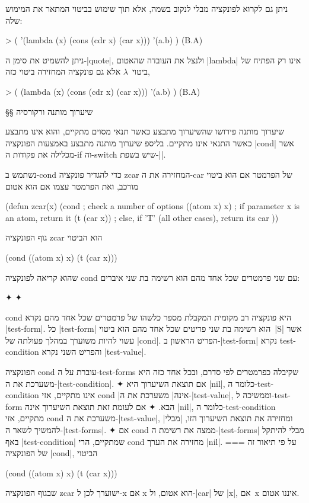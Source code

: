ניתן גם לקרוא לפונקציה מבלי לנקוב בשמה, אלא תוך שימוש בביטוי המתאר את המימוש
שלה:
\pagebreak[3]
\begin{LISP}
> (
    '(lambda (x)
      (cons (cdr x) (car x)))
    '(a.b)
)
(B.A)
\end{LISP}
ניתן להשמיט את סימן ה-\E|quote|, ולנצל את העובדה שהאטום \T|lambda| אינו רק
הפתיח של ביטוי~$λ$ אלא גם פונקציה המחזירה ביטוי כזה,
\begin{LISP}
> (
    (lambda (x) (cons (cdr x) (car x)))
    '(a.b)
)
(B.A)
\end{LISP}

§§ שיערוך מותנה ורקורסיה

שיערוך מותנה פירושו שהשיערוך מתבצע כאשר תנאי מסוים מתקיים, והוא אינו מתבצע
כאשר התנאי אינו מתקיים. בליספ שיערוך מותנה מתבצע באמצעות הפונקציה \E|cond|
אשר מכלילה את פקודות ה-if וה-switch שיש בשפת-\E|\CPL|.

נשתמש ב-cond כדי להגדיר פונקציה zcar המחזירה את ה-car של הפרמטר אם
הוא ביטוי מורכב, ואת הפרמטר עצמו אם הוא אטום
\begin{LISP}
(defun zcar(x)
  (cond ; check a number of options
    ((atom x) x) ; if parameter x is an atom, return it
    (t (car x)) ; else, if 'T' (all other cases), return its car
))
\end{LISP}
גוף הפונקציה zcar הוא הביטוי
\begin{LISP}
  (cond ((atom x) x) (t (car x)))
\end{LISP}
שהוא קריאה לפונקציה cond עם שני פרמטרים שכל אחד מהם הוא רשימה בת שני איברים:
\begin{LTR}
  \begin{itemize}
    ✦ 
    ✦ 
  \end{itemize}
\end{LTR}
cond היא פונקציה רב מקומית המקבלת מספר כלשהו של פרמטרים שכל אחד מהם נקרא
\E|test-form|. כל \E|test-form| הוא רשימה בת שני פריטים שכל אחד מהם הוא ביטוי~\E|S|
אשר עשוי להיות משוערך במהלך פעולתה של \E|cond|. הפריט הראשון ב-\E|test-form|
נקרא test-condition והפריט השני נקרא \E|test-value|.

הפונקציה cond עוברת על ה-test-forms שקיבלה כפרמטרים לפי סדרם, ובכל אחד כזה היא
משערכת את ה-\E|test-condition|.
✦ אם תוצאת השיערוך היא \E|nil|, כלומר ה-test-condition אינו מתקיים, אזי cond
\ע|אינה| משערכת את ה-\E|test-value|, וממשיכה ל-test-form הבא.
✦ אם לעומת זאת תוצאת השיערוך אינה \E|nil|, כלומר ה-test-condition מתקיים, אזי
cond משערכת את ה-\E|test-value|, ומחזירה את תוצאת השיערוך הזו, \ע|מבלי|
להמשיך לשאר ה-\E|test-forms|.
✦ אם cond ממצה את רשימת ה-\E|test-forms| מבלי להיתקל באף \E|test-condition|
שמתקיים, הרי cond מחזירה את הערך \E|nil|.
===
על פי תיאור זה של הפונקציה \E|cond|, הביטוי \begin{LISP}
  (cond ((atom x) x) (t (car x)))
\end{LISP}
שבגוף הפונקציה zcar ישוערך לכן ל-x אם x הוא אטום, ול-\E|car| של \E|x|, אם~x
איננו אטום.

